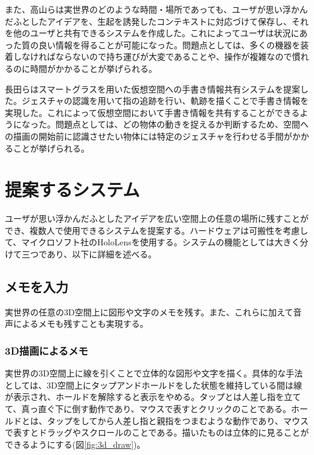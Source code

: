 \documentclass{hissymp}
\begin{document}
また、高山ら\cite{tex3,tex4}は実世界のどのような時間・場所であっても、ユーザが思い浮かんだふとしたアイデアを、生起を誘発したコンテキストに対応づけて保存し、それを他のユーザと共有できるシステムを作成した。これによってユーザは状況にあった質の良い情報を得ることが可能になった。問題点としては、多くの機器を装着しなければならないので持ち運びが大変であることや、操作が複雑なので慣れるのに時間がかかることが挙げられる。

長田ら\cite{tex5}はスマートグラスを用いた仮想空間への手書き情報共有システムを提案した。ジェスチャの認識を用いて指の追跡を行い、軌跡を描くことで手書き情報を実現した。これによって仮想空間において手書き情報を共有することができるようになった。問題点としては、どの物体の動きを捉えるか判断するため、空間への描画の開始前に認識させたい物体には特定のジェスチャを行わせる手間がかかることが挙げられる。


\section{提案するシステム}
ユーザが思い浮かんだふとしたアイデアを広い空間上の任意の場所に残すことができ、複数人で使用できるシステムを提案する。ハードウェアは可搬性を考慮して、マイクロソフト社のHoloLens\cite{tex6}を使用する。システムの機能としては大きく分けて三つであり、以下に詳細を述べる。

\subsection{メモを入力}
実世界の任意の3D空間上に図形や文字のメモを残す。また、これらに加えて音声によるメモも残すことも実現する。
\subsubsection{3D描画によるメモ}
実世界の3D空間上に線を引くことで立体的な図形や文字を描く。具体的な手法としては、3D空間上にタップアンドホールドをした状態を維持している間は線が表示され、ホールドを解除すると表示をやめる。タップとは人差し指を立てて、真っ直ぐ下に倒す動作であり、マウスで表すとクリックのことである。ホールドとは、タップをしてから人差し指と親指をつまむような動作であり、マウスで表すとドラッグやスクロールのことである。描いたものは立体的に見ることができるようにする(図\ref{fig:3d_draw})。
\end{document}
